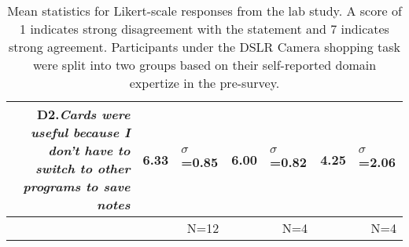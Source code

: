 \begin{table}
\begin{tabular}{ r  r l |  r l |  r l }
	\multicolumn{1}{p{0.54\columnwidth}}{D2.\textit{Cards were useful because I don't have to switch to other programs to save notes}
} &
    6.33 & $\sigma$=0.85 &
    6.00 & $\sigma$=0.82 &
    4.25 & $\sigma$=2.06 \\
    
	\hline
	
	
	&
	\multicolumn{2}{r}{N=12} &
	\multicolumn{2}{r}{N=4} &
	\multicolumn{2}{r}{N=4} \\
	
  \end{tabular}
  \caption{Mean statistics for Likert-scale responses from the lab study. A score of 1 indicates strong disagreement with the statement and 7 indicates strong agreement. Participants under the DSLR Camera shopping task were split into two groups based on their self-reported domain expertize in the pre-survey.}
  \label{tab:fusion_results}
\end{table}